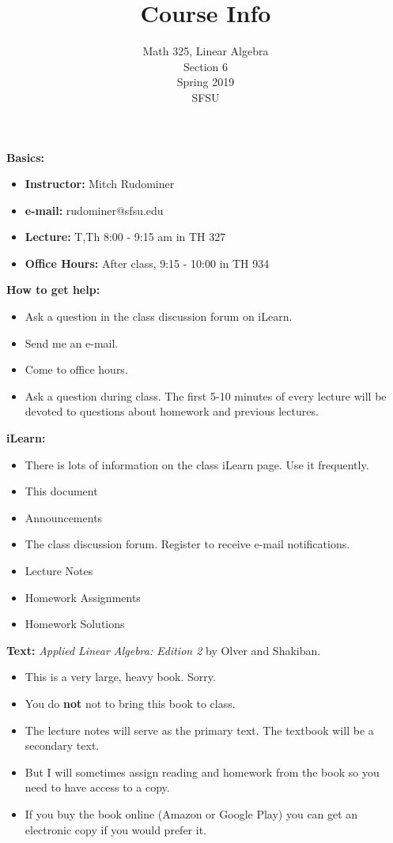 \documentclass[oneside,12pt]{amsart}
\begin{document}
\title{Course Info}
\author{Math 325, Linear Algebra \\ Section 6 \\ Spring 2019 \\ SFSU }
\date{}

\maketitle

\textbf{Basics:}
\begin{itemize}
\item \textbf{Instructor:} Mitch Rudominer
\item \textbf{e-mail:} rudominer@sfsu.edu
\item \textbf{Lecture:}  T,Th 8:00 - 9:15 am in TH 327
\item \textbf{Office Hours:} After class, 9:15 - 10:00 in TH 934
\end{itemize}

\bigskip

\textbf{How to get help:}
\begin{itemize}
\item Ask a question in the class discussion forum on iLearn.
\item Send me an e-mail.
\item Come to office hours.
\item Ask a question during class. The first 5-10 minutes of every lecture will be devoted to questions about homework and previous lectures.
\end{itemize}

\bigskip

\textbf{iLearn:}
\begin{itemize}
\item There is lots of information on the class iLearn page. Use it frequently.
\item This document
\item Announcements
\item The class discussion forum. Register to receive e-mail notifications.
\item Lecture Notes
\item Homework Assignments
\item Homework Solutions
\end{itemize}

\bigskip

\textbf{Text:} \emph{Applied Linear Algebra: Edition 2} by Olver and Shakiban.
\begin{itemize}
\item This is a very large, heavy book. Sorry.
\item You do \textbf{not} not to bring this book to class.
\item The lecture notes will serve as the primary text. The textbook will be a secondary text.
\item But I will sometimes assign reading and homework from the book so you need to have access to a copy.
\item If you buy the book online (Amazon or Google Play) you can get an electronic copy if you would prefer it.
\end{itemize}
\end{document}
